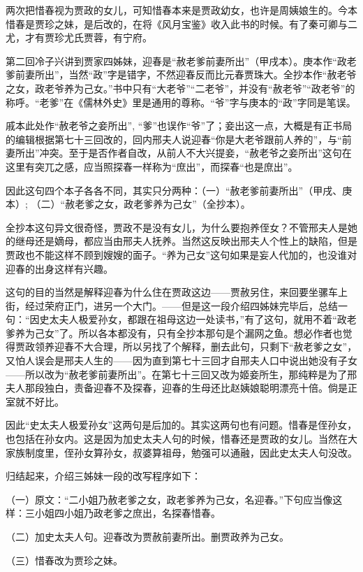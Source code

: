 \par 两次把惜春视为贾政的女儿，可知惜春本来是贾政幼女，也许是周姨娘生的。今本惜春是贾珍之妹，是后改的，在将《风月宝鉴》收入此书的时候。有了秦可卿与二尤，才有贾珍尤氏贾蓉，有宁府。
\par 第二回冷子兴讲到贾家四姊妹，迎春是“赦老爹前妻所出”（甲戌本）。庚本作“政老爹前妻所出”，当然“政”字是错字，不然迎春反而比元春贾珠大。全抄本作“赦老爷之女，政老爷养为己女。”书中只有“大老爷”“二老爷”，并没有“赦老爷”“政老爷”的称呼。“老爹”在《儒林外史》里是通用的尊称。“爷”字与庚本的“政”字同是笔误。
\par 戚本此处作“赦老爷之妾所出”, “爹”也误作“爷”了；妾出这一点，大概是有正书局的编辑根据第七十三回改的，回内邢夫人说迎春“你是大老爷跟前人养的”，与“前妻所出”冲突。至于是否作者自改，从前人不大兴提妾，“赦老爷之妾所出”这句在这里有突兀之感，应当照探春一样称为“庶出”，而探春“也是庶出”。
\par 因此这句四个本子各各不同，其实只分两种：（一）“赦老爹前妻所出”（甲戌、庚本）; （二）“赦老爹之女，政老爹养为己女”（全抄本）。
\par 全抄本这句异文很奇怪，贾政不是没有女儿，为什么要抱养侄女？不管邢夫人是她的继母还是嫡母，都应当由邢夫人抚养。当然这反映出邢夫人个性上的缺陷，但是贾政也不能这样不顾到嫂嫂的面子。“养为己女”这句如果是妄人代加的，也没谁对迎春的出身这样有兴趣。
\par 这句的目的当然是解释迎春为什么住在贾政这边——贾赦另住，来回要坐骡车上街，经过荣府正门，进另一个大门。——但是这一段介绍四姊妹完毕后，总结一句：“因史太夫人极爱孙女，都跟在祖母这边一处读书，”有了这句，就用不着“政老爹养为己女”了。所以各本都没有，只有全抄本那句是个漏网之鱼。想必作者也觉得贾政领养迎春不大合理，所以另找了个解释，删去此句，只剩下“赦老爹之女”，又怕人误会是邢夫人生的——因为直到第七十三回才自邢夫人口中说出她没有子女——所以改为“赦老爹前妻所出”。在第七十三回又改为姬妾所生，那纯粹是为了邢夫人那段独白，责备迎春不及探春，迎春的生母还比赵姨娘聪明漂亮十倍。倘是正室就不好比。
\par 因此“史太夫人极爱孙女”这两句是后加的。其实这两句也有问题。惜春是侄孙女，也包括在孙女内。这是因为加史太夫人句的时候，惜春还是贾政的女儿。当然在大家族制度里，侄孙女算孙女，叔婆算祖母，勉强可以通融，因此史太夫人句没改。
\par 归结起来，介绍三姊妹一段的改写程序如下：
\par （一）原文：“二小姐乃赦老爹之女，政老爹养为己女，名迎春。”下句应当像这样：三小姐四小姐乃政老爹之庶出，名探春惜春。
\par （二）加史太夫人句。迎春改为贾赦前妻所出。删贾政养为己女。
\par （三）惜春改为贾珍之妹。
